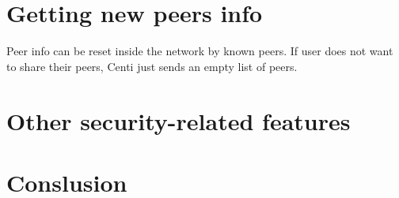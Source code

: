 \documentclass{article}
\begin{document}
\section{Getting new peers info}
	Peer info can be reset inside the network by known peers. If user does not want
	to share their peers, Centi just sends an empty list of peers.

\section{Other security-related features}

\section{Conslusion}
\end{document}
